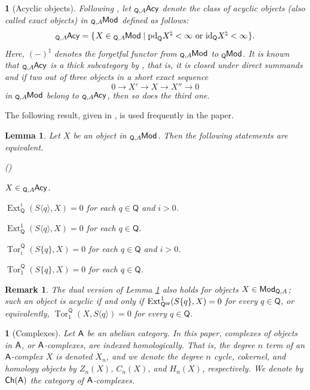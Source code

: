 \documentclass{amsart}
\theoremstyle{bfupright head,slanted body}
\theoremstyle{bfupright head,upright body}
\newtheorem{bfhpg}[res]{}               \newtheorem*{bfhpg*}{}
\theoremstyle{fixed bf head,slanted body}
\newtheorem{lem}[res]{Lemma}            \newtheorem*{lem*}{Lemma}
\theoremstyle{fixed bf head,upright body}
\newtheorem{rmk}[res]{Remark}           \newtheorem*{rmk*}{Remark}
\theoremstyle{numbered paragraph}
\newlength{\thmlistleft}        %
\newlength{\thmlistright}       %
\newlength{\thmlistpartopsep}   %
\newlength{\thmlisttopsep}      %
\newlength{\thmlistparsep}      %
\newlength{\thmlistitemsep}     %
\newcounter{eqc}
\newenvironment{eqc}{\begin{list}{\upshape (\textit{\roman{eqc}})}%
		{\usecounter{eqc}%
			\setlength{\leftmargin}{\thmlistleft}%
			\setlength{\labelwidth}{\thmlistleft}%
			\setlength{\rightmargin}{\thmlistright}%
			\setlength{\partopsep}{\thmlistpartopsep}%
			\setlength{\topsep}{\thmlisttopsep}%
			\setlength{\parsep}{\thmlistparsep}%
			\setlength{\itemsep}{\thmlistitemsep}}}%
	{\end{list}}%
\numberwithin{equation}{res}
\newcommand{\setof}[3][\mspace{1mu}]{\{#1#2 \mid #3#1\}}
\newcommand{\ch}[1]{\mathsf{Ch}(#1)}
\newcommand{\Ext}[4][]{\operatorname{Ext}_{#1}^{#2}(#3,#4)}
\newcommand{\Tor}[4][]{\operatorname{Tor}_{#2}^{#1}(#3,#4)}
\newcommand{\Q}{\mathsf{Q}}
\newcommand{\Qop}{\Q^{\sf op}}
\newcommand{\pd}{\mbox{\rm pd}}
\newcommand{\id}{\mathrm{id}}
\newcommand{\lMod}[1]{{}_{#1}\mspace{-1mu}{\sf{Mod}}}
\newcommand{\lE}[1]{{}_{#1}\mspace{-1mu}{\sf{Acy}}}
\newcommand{\rMod}[1]{{\sf{Mod}}_{#1}}
\begin{document}
\begin{bfhpg}[Acyclic objects]\label{acyclic}
Following \cite[Definition 4.1]{HJ22}, let $\lE{\Q,A}$ denote the class of \emph{acyclic objects} (also called \emph{exact objects}) in $\lMod{\Q,A}$ defined as follows:
$$\lE{\Q,A}=\setof{X\in\lMod{\Q,A}}{\pd_{\Q}X^{\natural}<\infty\ \mathrm{or}\ \id_{\Q}X^{\natural}<\infty}.$$
Here, $(-)^{\natural}$ denotes the forgetful functor from $\lMod{\Q,A}$ to $\lMod{\Q}$. It is known that $\lE{\Q,A}$ is a thick subcategory by \cite[Theorem 4.4]{HJ22}, that is, it is closed under direct summands and if two out of three objects in a short exact sequence
$$0 \to X' \to X \to X'' \to 0$$
in $\lMod{\Q,A}$ belong to $\lE{\Q,A}$, then so does the third one.
\end{bfhpg}

The following result, given in \cite[Theorem 7.1]{HJ22}, is used frequently in the paper.

\begin{lem}\label{lem:homology}
Let $X$ be an object in $\lMod{\Q,A}$. Then the following statements are equivalent.
\begin{eqc}
\item $X\in\lE{\Q,A}$.
\item $\Ext[\Q]{i}{S\langle q\rangle}{X}=0$ for each $q\in\Q$ and $i>0$.
\item $\Ext[\Q]{1}{S\langle q\rangle}{X}=0$ for each $q\in\Q$.
\item $\Tor[\Q]{i}{S\{q\}}{X}=0$ for each $q\in\Q$ and $i>0$.
\item $\Tor[\Q]{1}{S\{q\}}{X}=0$ for each $q\in\Q$.
\end{eqc}
\end{lem}

\begin{rmk}\label{rmk:dual-homology}
The dual version of Lemma \ref{lem:homology} also holds for objects $X\in\rMod{\Q,A}$; such an object is acyclic if and only if $\Ext[\Qop]{1}{S\{q\}}{X}=0$ for every $q\in\Q$, or equivalently, $\Tor[\Q]{1}{X}{S\langle q\rangle}=0$ for every $q\in\Q$.
\end{rmk}

\begin{bfhpg}[Complexes]
Let $\sf A$ be an abelian category. In this paper, complexes of objects in $\sf A$, or $\sf A$-complexes, are indexed homologically. That is, the degree $n$ term of an $\sf A$-complex $X$ is denoted $X_n$, and we denote the degree $n$ cycle, cokernel, and homology objects by $Z_n(X)$, $C_n(X)$, and $H_n(X)$, respectively. We denote by $\ch{\sf A}$ the category of $\sf A$-complexes.
\end{bfhpg}
\end{document}
